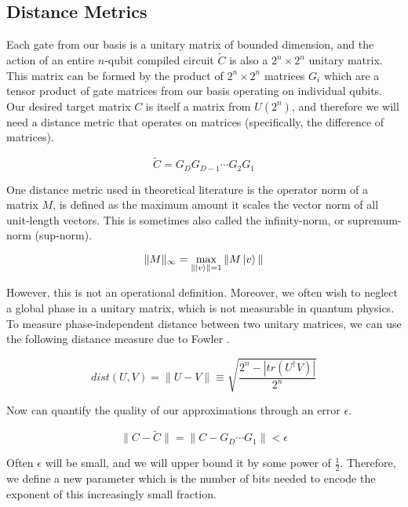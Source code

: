\subsection{Distance Metrics}
\label{subsec:distance}

Each gate from our basis is a unitary matrix of bounded dimension, and the action of an entire
$n$-qubit compiled circuit $\tilde{C}$
is also a $2^n \times 2^n$ unitary matrix. This matrix can be formed
by the product of $2^n \times 2^n$ matrices $G_i$ which are a tensor
product of gate matrices from our basis operating on individual qubits.
Our desired target matrix $C$ is itself
a matrix from $U(2^n)$, and therefore we will need a distance metric
that operates on matrices (specifically, the difference of matrices).

\begin{equation}
\tilde{C} = G_{D}G_{D-1}\cdots G_{2} G_{1}
\end{equation}

One distance metric used in theoretical literature
is the operator norm of a matrix $M$,
is defined as the maximum amount it scales the vector norm
of all unit-length vectors. This is sometimes also called the
infinity-norm, or supremum-norm (sup-norm).

\begin{equation}
\| M \|_{\infty} = \max_{\| \left\vert{v}\right\rangle \| = 1} \| M \left\vert{v}\right\rangle \|
\end{equation}

However, this is not an operational definition.
Moreover, we often wish to neglect a global phase in a unitary matrix,
which is not measurable in quantum physics. To measure phase-independent
distance between two unitary matrices, we can use the following
distance measure due to Fowler \cite{Fowler2011}.

\begin{equation}
dist(U, V) = \| U - V\| \equiv \sqrt{\frac{2^n - |tr(U^{\dag}V)|}{2^n}}
\end{equation}

Now can quantify the quality of our approximations through an
error $\epsilon$.

\begin{equation}
\| C - \tilde{C}\| = \| C -  G_D\cdots G_1 \| < \epsilon
\end{equation}

Often $\epsilon$ will be small, and we will upper bound it by some
power of $\frac{1}{2}$. Therefore, we define a
new parameter which is the number of bits needed to encode the exponent
of this increasingly small fraction.

